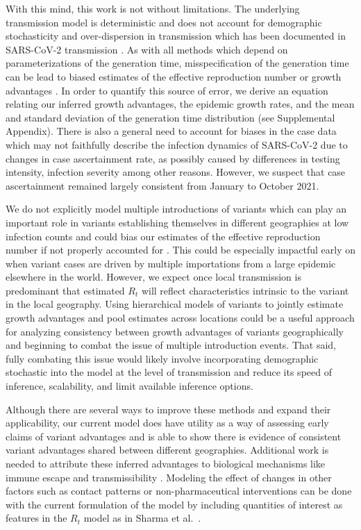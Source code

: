 \documentclass[11pt,oneside,letterpaper]{article}
\begin{document}
With this mind, this work is not without limitations.
The underlying transmission model is deterministic and does not account for demographic stochasticity and over-dispersion in transmission which has been documented in SARS-CoV-2 transmission \cite{Wong29416}.
As with all methods which depend on parameterizations of the generation time, misspecification of the generation time can be lead to biased estimates of the effective reproduction number or growth advantages \cite{Gostic2020}.
In order to quantify this source of error, we derive an equation relating our inferred growth advantages, the epidemic growth rates, and the mean and standard deviation of the generation time distribution (see Supplemental Appendix).
There is also a general need to account for biases in the case data which may not faithfully describe the infection dynamics of SARS-CoV-2 due to changes in case ascertainment rate, as possibly caused by differences in testing intensity, infection severity among other reasons.
However, we suspect that case ascertainment remained largely consistent from January to October 2021.

We do not explicitly model multiple introductions of variants which can play an important role in variants establishing themselves in different geographies at low infection counts and could bias our estimates of the effective reproduction number if not properly accounted for \cite{Cori2013, MullerWagner2021}.
This could be especially impactful early on when variant cases are driven by multiple importations from a large epidemic elsewhere in the world.
However, we expect once local transmission is predominant that estimated $R_{t}$ will reflect characteristics intrinsic to the variant in the local geography.
Using hierarchical models of variants to jointly estimate growth advantages and pool estimates across locations could be a useful approach for analyzing consistency between growth advantages of variants geographically and beginning to combat the issue of multiple introduction events.
That said, fully combating this issue would likely involve incorporating demographic stochastic into the model at the level of transmission and reduce its speed of inference, scalability, and limit available inference options.

Although there are several ways to improve these methods and expand their applicability, our current model does have utility as a way of assessing early claims of variant advantages and is able to show there is evidence of consistent variant advantages shared between different geographies.
Additional work is needed to attribute these inferred advantages to biological mechanisms like immune escape and transmissibility \cite{tao2021biological}.
Modeling the effect of changes in other factors such as contact patterns or non-pharmaceutical interventions can be done with the current formulation of the model by including quantities of interest as features in the $R_{t}$ model as in Sharma et al.\ \cite{Sharma2021}.
\end{document}
